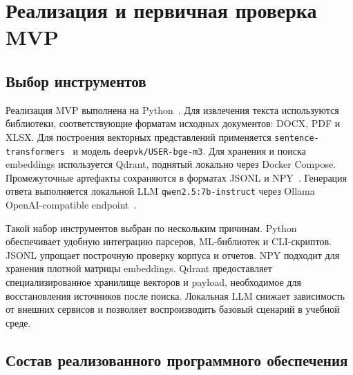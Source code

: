 \chapter{Реализация и первичная проверка MVP}
\label{chapter:implementation}

\section{Выбор инструментов}

Реализация MVP выполнена на Python~\cite{PythonDocs}. Для извлечения текста используются библиотеки, соответствующие форматам исходных документов: DOCX, PDF и XLSX. Для построения векторных представлений применяется \texttt{sentence-transformers}~\cite{SentenceTransformersDocs} и модель \texttt{deepvk/USER-bge-m3}. Для хранения и поиска embeddings используется Qdrant, поднятый локально через Docker Compose. Промежуточные артефакты сохраняются в форматах JSONL и NPY~\cite{JsonLines,NumpyDocs}. Генерация ответа выполняется локальной LLM \texttt{qwen2.5:7b-instruct} через Ollama OpenAI-compatible endpoint~\cite{OllamaDocs,OpenAICompatible}.

Такой набор инструментов выбран по нескольким причинам. Python обеспечивает удобную интеграцию парсеров, ML-библиотек и CLI-скриптов. JSONL упрощает построчную проверку корпуса и отчетов. NPY подходит для хранения плотной матрицы embeddings. Qdrant предоставляет специализированное хранилище векторов и payload, необходимое для восстановления источников после поиска. Локальная LLM снижает зависимость от внешних сервисов и позволяет воспроизводить базовый сценарий в учебной среде.

\section{Состав реализованного программного обеспечения}

